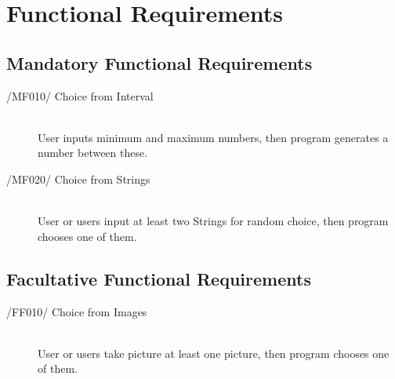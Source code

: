 \newpage
\section{Functional Requirements}

\subsection{Mandatory Functional Requirements}
\begin{description}
\item[/MF010/ Choice from Interval]\hfill \\ User inputs minimum and maximum numbers, then program generates a number between these.
\item[/MF020/ Choice from Strings]\hfill \\ User or users input at least two Strings for random choice, then program chooses one of them.

\end{description}

\subsection{Facultative  Functional Requirements}
\begin{description}
\item[/FF010/ Choice from Images]\hfill \\ User or users take picture at least one picture, then program chooses one of them.
\end{description}